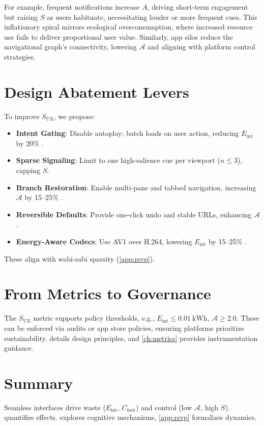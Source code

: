 \documentclass[openany]{book}
\newcommand{\Sent}{S} %
\newcommand{\Eint}{E_{\mathrm{int}}} %
\newcommand{\Cfoot}{C_{\mathrm{foot}}} %
\newcommand{\Auton}{\mathcal{A}} %
\newcommand{\SUX}{S_{\mathrm{UX}}} %
\newcommand{\kWh}{\mathrm{kWh}}
\begin{document}
For example, frequent notifications increase \(A\), driving short-term engagement but raising \(\Sent\) as users habituate, necessitating louder or more frequent cues. This inflationary spiral mirrors ecological overconsumption, where increased resource use fails to deliver proportional user value. Similarly, app silos reduce the navigational graph’s connectivity, lowering \(\Auton\) and aligning with platform control strategies.

\section{Design Abatement Levers}
\label{sec:abatement}
To improve \(\SUX\), we propose:
\begin{itemize}
  \item \textbf{Intent Gating}: Disable autoplay; batch loads on user action, reducing \(\Eint\) by 20\% \citep{extentia2024}.
  \item \textbf{Sparse Signaling}: Limit to one high-salience cue per viewport (\(n \leq 3\)), capping \(\Sent\).
  \item \textbf{Branch Restoration}: Enable multi-pane and tabbed navigation, increasing \(\Auton\) by 15--25\% \citep{doctorow2022}.
  \item \textbf{Reversible Defaults}: Provide one-click undo and stable URLs, enhancing \(\Auton\).
  \item \textbf{Energy-Aware Codecs}: Use AV1 over H.264, lowering \(\Eint\) by 15--25\% \citep{extentia2024}.
\end{itemize}
These align with wabi-sabi sparsity (\cref{app:rsvp}).

\section{From Metrics to Governance}
\label{sec:governance-preview}
The \(\SUX\) metric supports policy thresholds, e.g., \(\Eint \leq \SI{0.01}{\kWh}\), \(\Auton \geq 2.0\). These can be enforced via audits or app store policies, ensuring platforms prioritize sustainability.  details design principles, and \cref{ch:metrics} provides instrumentation guidance.

\section{Summary}
Seamless interfaces drive waste (\(\Eint\), \(\Cfoot\)) and control (low \(\Auton\), high \(\Sent\)).  quantifies effects.  explores cognitive mechanisms, \cref{app:rsvp} formalizes dynamics.
\end{document}
